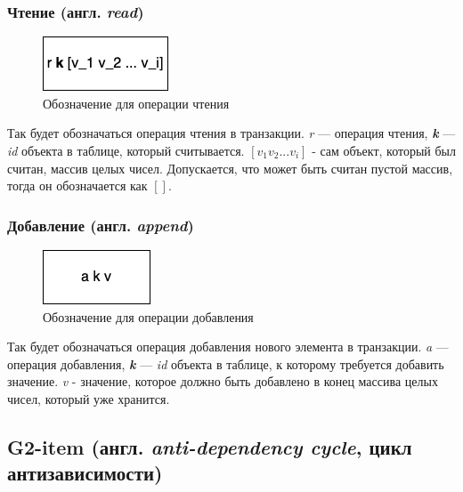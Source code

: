 \documentclass[12pt,  openany]{book}
\begin{document}
\subsubsection{Чтение (англ. \textit{read})}
\begin{figure}[H]
\centering
  \includegraphics[scale=1.0]{images/read.png}
  \caption{Обозначение для операции чтения}
\end{figure}
Так будет обозначаться операция чтения в транзакции. \textit{r} --- операция чтения, \textit{\textbf{k}} --- \textit{id} объекта в таблице, который считывается. $[v_1 v_2 ... v_i]$ - сам объект, который был считан, массив целых чисел. Допускается, что может быть считан пустой массив, тогда он обозначается как $[]$.

\subsubsection{Добавление (англ. \textit{append})}
\begin{figure}[H]
\centering
  \includegraphics[scale=1.0]{images/append.png}
  \caption{Обозначение для операции добавления}
\end{figure}
Так будет обозначаться операция добавления нового элемента в транзакции. \textit{a} --- операция добавления, \textit{\textbf{k}} --- \textit{id} объекта в таблице,  к которому требуется добавить значение. \textit{v} - значение, которое должно быть добавлено в конец массива целых чисел, который уже хранится.

\subsection{G2-item (англ. \textit{anti-dependency cycle}, цикл антизависимости)}
\end{document}
